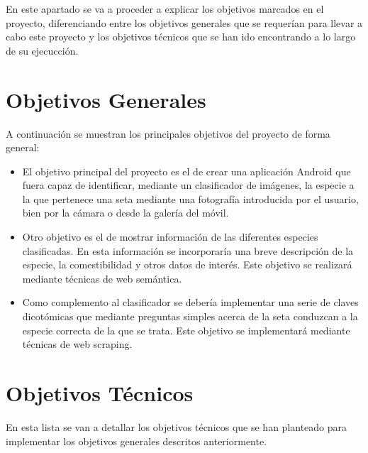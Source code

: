 
En este apartado se va a proceder a explicar los objetivos marcados en el proyecto, diferenciando entre los objetivos generales que se requerían para llevar a cabo este proyecto y los objetivos técnicos que se han ido encontrando a lo largo de su ejecucción.

\section{Objetivos Generales}

A continuación se muestran los principales objetivos del proyecto de forma general:

\begin{itemize}
	\item El objetivo principal del proyecto es el de crear una aplicación Android que fuera capaz de identificar, mediante un clasificador de imágenes, la especie a la que pertenece una seta mediante una fotografía introducida por el usuario, bien por la cámara o desde la galería del móvil.
	\item Otro objetivo es el de mostrar información de las diferentes especies clasificadas. En esta información se incorporaría una breve descripción de la especie, la comestibilidad y otros datos de interés. Este objetivo se realizará mediante técnicas de web semántica.
	\item Como complemento al clasificador se debería implementar una serie de claves dicotómicas que mediante preguntas simples acerca de la seta conduzcan a la especie correcta de la que se trata. Este objetivo se implementará mediante técnicas de web scraping.
\end{itemize}

\section{Objetivos Técnicos}

En esta lista se van a detallar los objetivos técnicos que se han planteado para implementar los objetivos generales descritos anteriormente.

